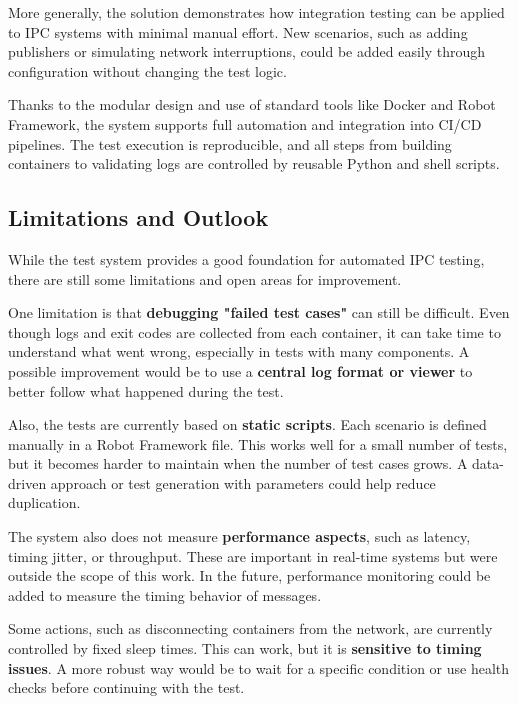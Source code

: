 \vspace{1em}
More generally, the solution demonstrates how integration testing can be applied to IPC systems with minimal manual effort. New scenarios, such as adding publishers or simulating network interruptions, could be added easily through configuration without changing the test logic.

\vspace{1em}
Thanks to the modular design and use of standard tools like Docker and Robot Framework, the system supports full automation and integration into CI/CD pipelines. The test execution is reproducible, and all steps from building containers to validating logs are controlled by reusable Python and shell scripts.

\subsection*{Limitations and Outlook}

While the test system provides a good foundation for automated IPC testing, there are still some limitations and open areas for improvement.

\vspace{1em}
One limitation is that \textbf{debugging "failed test cases"} can still be difficult. Even though logs and exit codes are collected from each container, it can take time to understand what went wrong, especially in tests with many components. A possible improvement would be to use a \textbf{central log format or viewer} to better follow what happened during the test.

\vspace{1em}
Also, the tests are currently based on \textbf{static scripts}. Each scenario is defined manually in a Robot Framework file. This works well for a small number of tests, but it becomes harder to maintain when the number of test cases grows. A data-driven approach or test generation with parameters could help reduce duplication.

\vspace{1em}
The system also does not measure \textbf{performance aspects}, such as latency, timing jitter, or throughput. These are important in real-time systems but were outside the scope of this work. In the future, performance monitoring could be added to measure the timing behavior of messages.

\vspace{1em}
Some actions, such as disconnecting containers from the network, are currently controlled by fixed sleep times. This can work, but it is \textbf{sensitive to timing issues}. A more robust way would be to wait for a specific condition or use health checks before continuing with the test.

